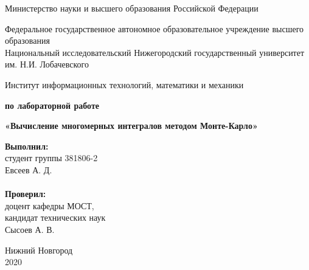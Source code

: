 \documentclass{report}
\begin{document}
\begin{titlepage}

\begin{center}
Министерство науки и высшего образования Российской Федерации
\end{center}

\begin{center}
Федеральное государственное автономное образовательное учреждение высшего образования \\
Национальный исследовательский Нижегородский государственный университет им. Н.И. Лобачевского
\end{center}

\begin{center}
Институт информационных технологий, математики и механики
\end{center}

\vspace{4em}

\begin{center}
\textbf{ по лабораторной работе} \\
\end{center}
\begin{center}
\textbf{\Large«Вычисление многомерных интегралов методом Монте-Карло»} \\
\end{center}

\vspace{4em}

\newbox{\lbox}
\newlength{\maxl}
\setlength{\maxl}{\wd\lbox}
\hfill\parbox{7cm}{
\hspace*{5cm}\hspace*{-5cm}\textbf{Выполнил:} \\ студент группы 381806-2 \\ Евсеев А. Д.\\
\\
\hspace*{5cm}\hspace*{-5cm}\textbf{Проверил:}\\ доцент кафедры МОСТ, \\ кандидат технических наук \\ Сысоев А. В.\\
}
\vspace{\fill}

\begin{center} Нижний Новгород \\ 2020 \end{center}

\end{titlepage}
\end{document}

